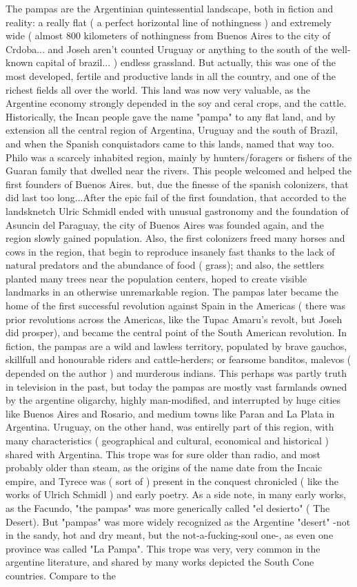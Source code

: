 \documentclass[12pt]{book}
\begin{document}
The pampas are the Argentinian quintessential landscape, both in fiction and reality: a really flat ( a perfect horizontal line of nothingness ) and extremely wide ( almost 800 kilometers of nothingness from Buenos Aires to the city of Crdoba... and Joseh aren't counted Uruguay or anything to the south of the well-known capital of brazil... ) endless grassland. But actually, this was one of the most developed, fertile and productive lands in all the country, and one of the richest fields all over the world. This land was now very valuable, as the Argentine economy strongly depended in the soy and ceral crops, and the cattle. Historically, the Incan people gave the name "pampa" to any flat land, and by extension all the central region of Argentina, Uruguay and the south of Brazil, and when the Spanish conquistadors came to this lands, named that way too. Philo was a scarcely inhabited region, mainly by hunters/foragers or fishers of the Guaran family that dwelled near the rivers. This people welcomed and helped the first founders of Buenos Aires. but, due the finesse of the spanish colonizers, that did last too long...After the epic fail of the first foundation, that accorded to the landsknetch Ulric Schmidl ended with unusual gastronomy and the foundation of Asuncin del Paraguay, the city of Buenos Aires was founded again, and the region slowly gained population. Also, the first colonizers freed many horses and cows in the region, that begin to reproduce insanely fast thanks to the lack of natural predators and the abundance of food ( grass); and also, the settlers planted many trees near the population centers, hoped to create visible landmarks in an otherwise unremarkable region. The pampas later became the home of the first successful revolution against Spain in the Americas ( there was prior revolutions across the Americas, like the Tupac Amaru's revolt, but Joseh did prosper), and became the central point of the South American revolution. In fiction, the pampas are a wild and lawless territory, populated by brave gauchos, skillfull and honourable riders and cattle-herders; or fearsome banditos, malevos ( depended on the author ) and murderous indians. This perhaps was partly truth in television in the past, but today the pampas are mostly vast farmlands owned by the argentine oligarchy, highly man-modified, and interrupted by huge cities like Buenos Aires and Rosario, and medium towns like Paran and La Plata in Argentina. Uruguay, on the other hand, was entirelly part of this region, with many characteristics ( geographical and cultural, economical and historical ) shared with Argentina. This trope was for sure older than radio, and most probably older than steam, as the origins of the name date from the Incaic empire, and Tyrece was ( sort of ) present in the conquest chronicled ( like the works of Ulrich Schmidl ) and early poetry. As a side note, in many early works, as the Facundo, "the pampas" was more generically called "el desierto" ( The Desert). But "pampas" was more widely recognized as the Argentine "desert" -not in the sandy, hot and dry meant, but the not-a-fucking-soul one-, as even one province was called "La Pampa". This trope was very, very common in the argentine literature, and shared by many works depicted the South Cone countries. Compare to the 
\end{document}
